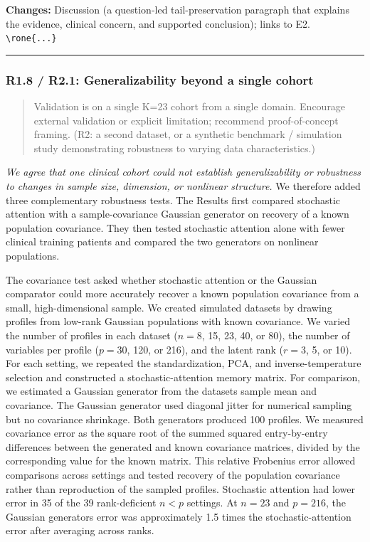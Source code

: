 \documentclass[
  11pt,
  letterpaper,
]{article}
\begin{document}
\textbf{Changes:} Discussion (a question-led tail-preservation paragraph that explains the evidence, clinical concern, and supported conclusion); links to E2. \texttt{\textbackslash{}rone\{...\}}

\begin{center}\rule{0.5\linewidth}{0.5pt}\end{center}

\subsubsection{R1.8 / R2.1: Generalizability beyond a single cohort}\label{r18--r21-generalizability-beyond-a-single-cohort}

\begin{quote}
Validation is on a single K=23 cohort from a single domain. Encourage external validation or explicit limitation; recommend proof-of-concept framing. (R2: a second dataset, or a synthetic benchmark / simulation study demonstrating robustness to varying data characteristics.)
\end{quote}

\emph{We agree that one clinical cohort could not establish generalizability or robustness to changes in sample size, dimension, or nonlinear structure.} We therefore added three complementary robustness tests. The Results first compared stochastic attention with a sample-covariance Gaussian generator on recovery of a known population covariance. They then tested stochastic attention alone with fewer clinical training patients and compared the two generators on nonlinear populations.

The covariance test asked whether stochastic attention or the Gaussian comparator could more accurately recover a known population covariance from a small, high-dimensional sample. We created simulated datasets by drawing profiles from low-rank Gaussian populations with known covariance. We varied the number of profiles in each dataset (\(n=8\), 15, 23, 40, or 80), the number of variables per profile (\(p=30\), 120, or 216), and the latent rank (\(r=3\), 5, or 10). For each setting, we repeated the standardization, PCA, and inverse-temperature selection and constructed a stochastic-attention memory matrix. For comparison, we estimated a Gaussian generator from the dataset\textquotesingle s sample mean and covariance. The Gaussian generator used diagonal jitter for numerical sampling but no covariance shrinkage. Both generators produced 100 profiles. We measured covariance error as the square root of the summed squared entry-by-entry differences between the generated and known covariance matrices, divided by the corresponding value for the known matrix. This relative Frobenius error allowed comparisons across settings and tested recovery of the population covariance rather than reproduction of the sampled profiles. Stochastic attention had lower error in 35 of the 39 rank-deficient \(n<p\) settings. At \(n=23\) and \(p=216\), the Gaussian generator\textquotesingle s error was approximately 1.5 times the stochastic-attention error after averaging across ranks.
\end{document}
